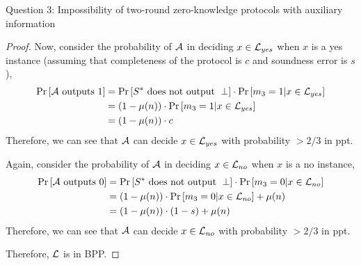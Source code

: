 \begin{solution}{Question 3: Impossibility of two-round zero-knowledge protocols with auxiliary information}
\begin{proof}
        Now, consider the probability of $\mathcal{A}$ in deciding $x \in \mathcal{L}_{yes}$ when $x$ is a yes instance (assuming that completeness of the protocol is $c$ and soundness error is $s$),
        \begin{equation}
            \begin{split}
                \Pr\left[ \mathcal{A}\text{ outputs }1 \right] &= \Pr\left[ S^*\text{ does not output }\perp \right]\cdot \Pr\left[ m_3 = 1 | x \in \mathcal{L}_{yes} \right]\\
                                             &= (1 - \mu(n))\cdot \Pr\left[ m_3 = 1 | x \in \mathcal{L}_{yes} \right]\\
                                             &= (1 - \mu(n))\cdot c
            \end{split}
        \end{equation}
        Therefore, we can see that $\mathcal{A}$ can decide $x \in \mathcal{L}_{yes}$ with probability $ > 2/3$ in ppt.

        Again, consider the probability of $\mathcal{A}$ in deciding $x \in \mathcal{L}_{no}$ when $x$ is a no instance,
        \begin{equation}
            \begin{split}
                \Pr\left[ \mathcal{A}\text{ outputs }0 \right] &= \Pr\left[ S^*\text{ does not output }\perp \right]\cdot \Pr\left[ m_3 = 0 | x \in \mathcal{L}_{no} \right]\\
                                             &= (1 - \mu(n))\cdot \Pr\left[ m_3 = 0 | x \in \mathcal{L}_{no} \right] + \mu(n)\\
                                             &= (1 - \mu(n))\cdot (1 - s) + \mu(n)
            \end{split}
        \end{equation}
        Therefore, we can see that $\mathcal{A}$ can decide $x \in \mathcal{L}_{no}$ with probability $ > 2/3$ in ppt.

        Therefore, $\mathcal{L}$ is in BPP.
    \end{proof}
\end{solution}
